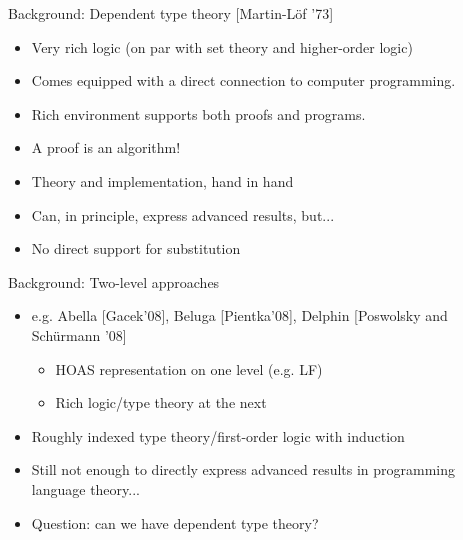 \documentclass[usenames,dvipsnames]{beamer}
\begin{document}
\begin{frame}{Background: Dependent type theory [Martin-L\"of '73]}
\begin{itemize}
\item Very rich logic (on par with set theory and higher-order logic)
\item Comes equipped with a direct
connection to computer programming.
\item Rich environment supports both proofs and programs.
\item A proof is an algorithm!
\item Theory and implementation, hand in hand
\item Can, in principle, express advanced results, but...
\item No direct support for substitution
\end{itemize}
\end{frame}

\begin{frame}{Background: Two-level approaches}
\begin{itemize}
\item e.g. Abella [Gacek'08], Beluga [Pientka'08], Delphin [Poswolsky and Sch\"urmann '08]
\begin{itemize}
\item HOAS representation on one level (e.g. LF)
\item Rich logic/type theory at the next
\end{itemize}
\item Roughly indexed type theory/first-order logic with induction
\item Still not enough to directly express advanced results in programming language theory...
\pause \item Question: can we have dependent type theory?
\end{itemize}
\end{frame}
\end{document}
